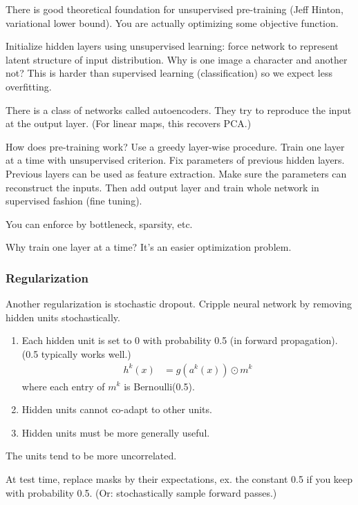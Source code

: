 There is good theoretical foundation for unsupervised pre-training (Jeff Hinton, variational lower bound). 
You are actually optimizing some objective function.

Initialize hidden layers using unsupervised learning: force network to represent latent structure of input distribution. Why is one image a character and another not? This is harder than supervised learning (classification) so we expect less overfitting. 

There is a class of networks called autoencoders. They try to reproduce the input at the output layer. (For linear maps, this recovers PCA.)

How does pre-training work? Use a greedy layer-wise procedure.  Train one layer at a time with unsupervised criterion. Fix parameters of previous hidden layers. Previous layers can be used as feature extraction. Make sure the parameters can reconstruct the inputs.
Then add output layer and train whole network in supervised fashion (fine tuning).

You can enforce by bottleneck, sparsity, etc.

Why train one layer at a time? It's an easier optimization problem.
\subsubsection{Regularization}
Another regularization is stochastic dropout.  Cripple neural network by removing hidden units stochastically. 
\begin{enumerate}
\item
Each hidden unit is set to 0 with probability 0.5 (in forward propagation). (0.5 typically works well.)
\begin{align}
h^k(x)& = g(a^k(x)) \odot m^k %
\end{align}
where each entry of $m^k$ is Bernoulli(0.5).
\item
Hidden units cannot co-adapt to other units.
\item
Hidden units must be more generally useful.
\end{enumerate}
The units tend to be more uncorrelated.


At test time, replace masks by their expectations, ex. the constant 0.5 if you keep with probability 0.5.
(Or: stochastically sample forward passes.)

